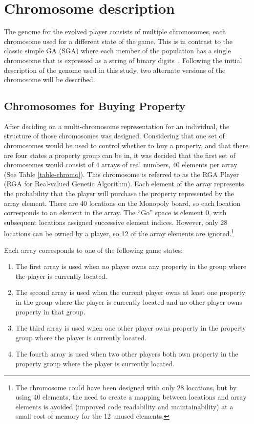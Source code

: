 \section{Chromosome description} \label{5_chromo}

The genome for the evolved player consists of multiple chromosomes, each
chromosome used for a different state of the game. This is in contrast to the
classic simple GA (SGA) where each member of the population has a single
chromosome that is expressed as a string of binary
digits~\cite{haupt2004practical}. Following the initial description of the
genome used in this study, two alternate versions of the chromosome will be
described.

\subsection{Chromosomes for Buying Property}

After deciding on a multi-chromosome representation for an individual, the
structure of those chromosomes was designed. Considering that one set of
chromosomes would be used to control whether to buy a property, and that there
are four states a property group can be in, it was decided that the first set of
chromosomes would consist of 4 arrays of real numbers, 40 elements per array
(See Table \ref{table-chromo}). This chromosome is referred to as the RGA Player
(RGA for Real-valued Genetic Algorithm). Each element of the array represents
the probability that the player will purchase the property represented by the
array element. There are 40 locations on the Monopoly board, so each location
corresponds to an element in the array. The ``Go'' space is element 0, with
subsequent locations assigned successive element indices.
However, only 28 locations can be owned by a player, so 12 of the array elements
are ignored.\footnote{The chromosome could have been designed with only 28
locations, but by using 40 elements, the need to create a mapping between
locations and array elements is avoided (improved code readability and
maintainability) at a small cost of memory for the 12 unused elements.}

Each array corresponds to one of the following game states:

\begin{enumerate}
  \item{The first array is used when no player owns any property in the group
  where the player is currently located.}
  \item{The second array is used when the current player owns at least one
  property in the group where the player is currently located and no other
  player owns property in that group.}
  \item{The third array is used when one other player owns property in the
  property group where the player is currently located.}
  \item{The fourth array is used when two other players both own property in the
  property group where the player is currently located.}
\end{enumerate}

